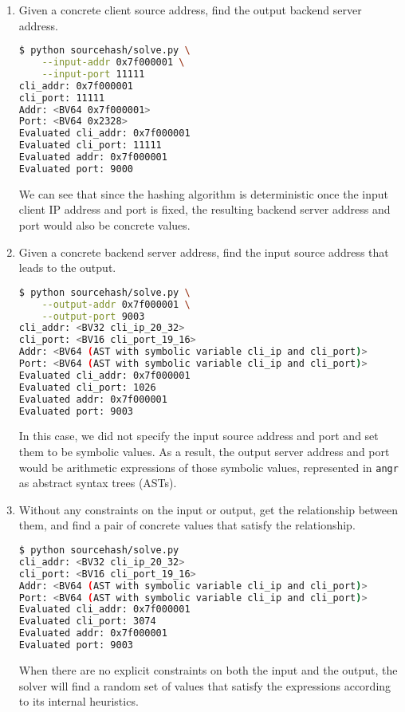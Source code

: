 \begin{enumerate}
    \item Given a concrete client source address, find the output backend server
        address.

\begin{lstlisting}[language=bash]
$ python sourcehash/solve.py \
    --input-addr 0x7f000001 \
    --input-port 11111
cli_addr: 0x7f000001
cli_port: 11111
Addr: <BV64 0x7f000001>
Port: <BV64 0x2328>
Evaluated cli_addr: 0x7f000001
Evaluated cli_port: 11111
Evaluated addr: 0x7f000001
Evaluated port: 9000
\end{lstlisting}

        We can see that since the hashing algorithm is deterministic once the
        input client IP address and port is fixed, the resulting backend server
        address and port would also be concrete values.

    \item Given a concrete backend server address, find the input source address
        that leads to the output.

\begin{lstlisting}[language=bash]
$ python sourcehash/solve.py \
    --output-addr 0x7f000001 \
    --output-port 9003
cli_addr: <BV32 cli_ip_20_32>
cli_port: <BV16 cli_port_19_16>
Addr: <BV64 (AST with symbolic variable cli_ip and cli_port)>
Port: <BV64 (AST with symbolic variable cli_ip and cli_port)>
Evaluated cli_addr: 0x7f000001
Evaluated cli_port: 1026
Evaluated addr: 0x7f000001
Evaluated port: 9003
\end{lstlisting}

        In this case, we did not specify the input source address and port and
        set them to be symbolic values. As a result, the output server address
        and port would be arithmetic expressions of those symbolic values,
        represented in \texttt{angr} as abstract syntax trees (ASTs).

    \item Without any constraints on the input or output, get the relationship
        between them, and find a pair of concrete values that satisfy the
        relationship.

\begin{lstlisting}[language=bash]
$ python sourcehash/solve.py
cli_addr: <BV32 cli_ip_20_32>
cli_port: <BV16 cli_port_19_16>
Addr: <BV64 (AST with symbolic variable cli_ip and cli_port)>
Port: <BV64 (AST with symbolic variable cli_ip and cli_port)>
Evaluated cli_addr: 0x7f000001
Evaluated cli_port: 3074
Evaluated addr: 0x7f000001
Evaluated port: 9003
\end{lstlisting}

        When there are no explicit constraints on both the input and the output,
        the solver will find a random set of values that satisfy the expressions
        according to its internal heuristics.
\end{enumerate}


